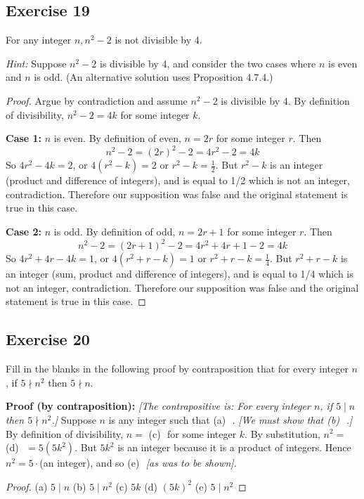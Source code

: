 \documentclass[14pt]{extarticle}
\newcommand{\fbl}{\underline{\hspace{1cm}}\,\,}
\newcommand{\cy}{\color{cyan}}
\begin{document}
\subsection{Exercise 19}
For any integer $n, n^2 - 2$ is not divisible by 4.

    {\it Hint:} Suppose $n^2 - 2$ is divisible by 4, and consider the two cases where $n$ is even and $n$ is odd. (An alternative solution uses Proposition 4.7.4.)

\begin{proof}
    Argue by contradiction and assume $n^2 - 2$ is divisible by 4. By definition of divisibility, $n^2-2 = 4k$ for some integer $k$.

        {\bf Case 1:} $n$ is even. By definition of even, $n = 2r$ for some integer $r$. Then
    \[
        n^2 - 2 = (2r)^2-2 = 4r^2-2 = 4k
    \]
    So $4r^2-4k = 2$, or $4(r^2-k) = 2$ or $r^2-k = \frac{1}{2}$. But $r^2-k$ is an integer (product and difference of integers), and is equal to 1/2 which is not an integer, contradiction. Therefore our supposition was false and the original statement is true in this case.

        {\bf Case 2:} $n$ is odd. By definition of odd, $n = 2r+1$ for some integer $r$. Then
    \[
        n^2 - 2 = (2r+1)^2-2 = 4r^2+4r+1-2 = 4k
    \]
    So $4r^2+4r-4k = 1$, or $4(r^2+r-k) = 1$ or $r^2+r-k = \frac{1}{4}$. But $r^2+r-k$ is an integer (sum, product and difference of integers), and is equal to 1/4 which is not an integer, contradiction. Therefore our supposition was false and the original statement is true in this case.
\end{proof}

\subsection{Exercise 20}
Fill in the blanks in the following proof by contraposition that for every integer $n$, if $5 \nmid n^2$ then $5 \nmid n$.

    {\bf Proof (by contraposition):} {\it[The contrapositive is: For every integer $n$, if $5 \mid n$ then $5 \nmid n^2$.]} Suppose $n$ is any integer such that {\cy (a)} \fbl. {\it[We must show that {\cy(b)} \fbl.]} By definition of divisibility, $n = $ {\cy(c)} \fbl for some integer $k$. By substitution, $n^2 = $ {\cy(d)} \fbl $= 5(5k^2)$. But $5k^2$ is an integer because it is a product of integers. Hence $n^2 = 5\cdot$(an integer), and so {\cy(e)} \fbl {\it[as was to be shown].}

\begin{proof}
    (a) $5 \mid n$ (b) $5 \mid n^2$ (c) $5k$ (d) $(5k)^2$ (e) $5 \mid n^2$
\end{proof}
\end{document}
